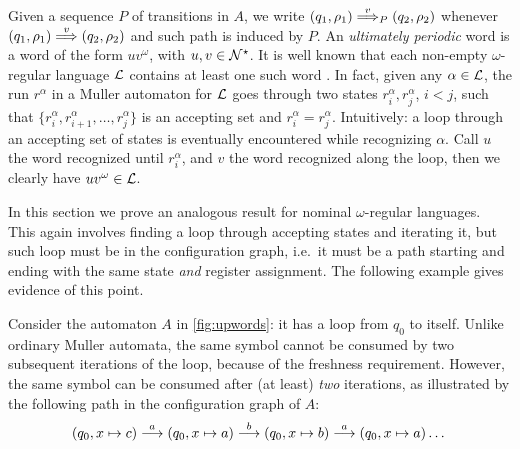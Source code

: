 %
%
{
Given a sequence $P$ of transitions in $A$, we write $(q_1,\rho_1) \overset{v}{\Longrightarrow}_{P} (q_2,\rho_2)$ whenever $(q_1,\rho_1) \overset{v}{\Longrightarrow} (q_2,\rho_2)$ and such path is induced by $P$.
}
%
An \emph{ultimately periodic} word is a word of the form $uv^\omega$, with $u,v \in \mathcal{N}^\star$.  It is well known that each non-empty $\omega$-regular language $\mathcal{L}$ contains at least one such word \cite{CalbrixNP93}. In fact, given any $\alpha \in \mathcal{L}$, the run $r^\alpha$ in a Muller automaton for $\mathcal{L}$ goes through two states $r^\alpha_i,r^\alpha_j$, $i<j$, such that $\{r^\alpha_i,r^\alpha_{i+1},\dots,r^\alpha_j\}$ is an accepting set and $r^\alpha_i = r^\alpha_j$. Intuitively: a loop through an accepting set of states is eventually encountered while recognizing $\alpha$. Call $u$ the word recognized until $r^\alpha_i$, and $v$ the word recognized along the loop, then we clearly have $uv^\omega \in \mathcal{L}$.

In this section we prove an analogous result for nominal $\omega$-regular languages. This again involves finding a loop through accepting states and iterating it, but such loop must be in the configuration graph, i.e.\ it must be a path starting and ending with the same state \emph{and} register assignment. The following example gives evidence of this point.
%

\begin{example}
Consider the automaton $A$ in \cref{fig:upwords}: it has a loop from $q_0$ to itself. Unlike ordinary Muller automata, the same symbol cannot be consumed by two subsequent iterations of the loop, because of the freshness requirement. However, the same symbol can be consumed after (at least) \emph{two} iterations, as illustrated by the following path in the configuration graph of $A$:
\[
	(q_0,x \mapsto c) \overset{a}{\longrightarrow} (q_0,x \mapsto a) \overset{b}{\longrightarrow} (q_0,x \mapsto b) \overset{a}{\longrightarrow} (q_0,x \mapsto a) \dots
\]
\end{example}


